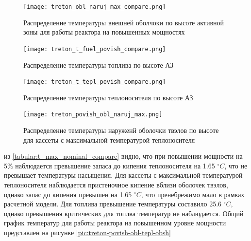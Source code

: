 \begin{figure}[H]
	\begin{center}
		\texttt{[image: treton\_obl\_naruj\_max\_compare.png]}
		\caption{Распределение температуры внешней оболчоки по высоте активной зоны для работы реактора на повышенных мощностях }
		\label{pic:treton-obl-naruj-max-compare} %
	\end{center}
\end{figure}

\begin{figure}[H]
	\begin{center}
		\texttt{[image: treton\_t\_fuel\_povish\_compare.png]}
		\caption{Распределение температуры топлива по высоте АЗ}
		\label{pic:treton-t-fuel-povish-compare} %
	\end{center}
\end{figure}

\begin{figure}[H]
	\begin{center}
		\texttt{[image: treton\_t\_tepl\_povish\_compare.png]}
		\caption{Распределение температуры теплоносителя по высоте АЗ}
		\label{pic:treton-t-tepl-povish-compare} %
	\end{center}
\end{figure}

\begin{figure}[H]
	\begin{center}
		\texttt{[image: treton\_povish\_obl\_naruj\_max.png]}
		\caption{Распределение температуры наруженй оболочки твэлов по высоте для кассеты с максимальной температурой теплоносителя}
		\label{pic:treton-povish-obl-naruj-max} %
	\end{center}
\end{figure}

из \ref{tabular:t_max_nominal_compare} видно, что при повышении мощности на 5\% наблюдается превышение запаса до кипения теплоносителя на 1.65 $^\circ C$, что не превышает температуры насыщения. Для кассеты с максимальной температурой теплоносителя наблюдается пристеночное кипение вблизи оболочек твэлов, однако запас до кипения превышен на 1.65 $^\circ C$, что пренебрежимо мало в рамках расчетной модели.  
Для топлива превышение температуры составило 25.6 $^\circ C$, однако превышения критических для топлва температур не наблюдается. Общий график температур для работы реактора на повышенном уровне мощности представлен на рисунке \ref{pic:treton-povish-obl-tepl-obsh}

